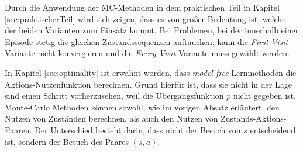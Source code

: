 \par 
 Durch die Anwendung der MC-Methoden in dem praktischen Teil in Kapitel \ref{sec:praktischerTeil} wird sich zeigen, dass es von großer Bedeutung ist, welche der beiden Varianten zum Einsatz kommt. Bei Problemen, bei der innerhalb einer Episode stetig die gleichen Zustandssequenzen auftauchen, kann die \textit{First-Visit} Variante nicht konvergieren und die \textit{Every-Visit} Variante muss gewählt werden.
\par 
In Kapitel \ref{sec:optimality} ist erwähnt worden, dass \textit{model-free} Lernmethoden die Aktions-Nutzenfunktion berechnen. Grund hierfür ist, dass sie nicht in der Lage sind einen Schritt vorherzusehen, weil die Übergangsfunktion $p$ nicht gegeben ist. Monte-Carlo Methoden können sowohl, wie im vorigen Absatz erläutert, den Nutzen von Zuständen berechnen, als auch den Nutzen von Zustands-Aktions-Paaren. Der Unterschied besteht darin, dass nicht der Besuch von $s$ entscheidend ist, sondern der Besuch des Paares $(s,a)$.

